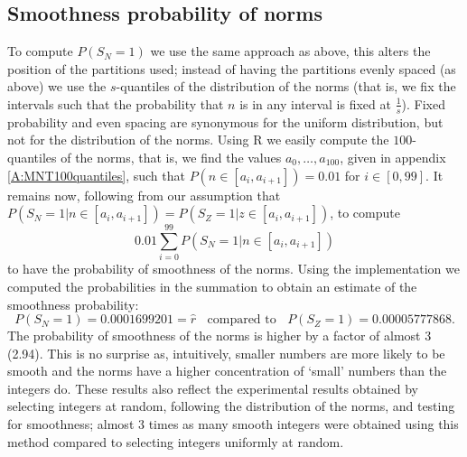 \documentclass[a4paper, 10pt, envcountsect, runningheads]{lms}
\numberwithin{figure}{section}
\numberwithin{equation}{section}
\begin{document}
\subsection{Smoothness probability of norms}
\label{ss:smoothness}
To compute $P(S_N=1)$ we use the same approach as above, this alters the position of the partitions used; instead of having the partitions evenly spaced (as above) we use the $s$-quantiles of the distribution of the norms (that is, we fix the intervals such that the probability that $n$ is in any interval is fixed at $\frac{1}{s}$). Fixed probability and even spacing are synonymous for the uniform distribution, but not for the distribution of the norms. Using R we easily compute the $100$-quantiles of the norms, that is, we find the values $a_0,\ldots,a_{100}$, given in appendix \ref{A:MNT100quantiles}, such that $P(n\in[a_i,a_{i+1}])=0.01$ for $i\in[0,99]$. It remains now, following from our assumption that $P(S_N=1| n\in[a_i,a_{i+1}])=P(S_Z=1| z\in[a_i,a_{i+1}])$, to compute $$0.01\sum_{i=0}^{99}P(S_N=1| n\in[a_i,a_{i+1}])$$ to have the probability of smoothness of the norms. Using the implementation \cite{dan_imp} we computed the probabilities in the summation to obtain an estimate of the smoothness probability: $$P(S_N=1)=0.0001699201=\hat{r}\;\;\mbox{ compared to }\;\;P(S_Z=1)=0.00005777868.$$
The probability of smoothness of the norms is higher by a factor of almost 3 (2.94). This is no surprise as, intuitively, smaller numbers are more likely to be smooth and the norms have a higher concentration of `small' numbers than the integers do. These results also reflect the experimental results obtained by selecting integers at random, following the distribution of the norms, and testing for smoothness; almost 3 times as many smooth integers were obtained using this method compared to selecting integers uniformly at random.
\end{document}
